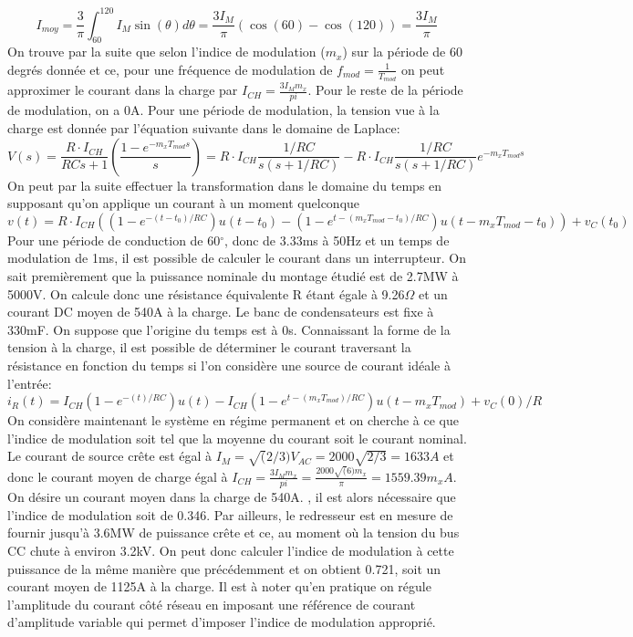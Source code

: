 \begin{equation}
I_{moy} = \frac{3}{\pi}\int_{60}^{120} I_M \sin(\theta)d\theta = \frac{3I_M}{\pi}\left( \cos(60)-\cos(120)\right) = \frac{3I_M}{\pi}
\end{equation}
On trouve par la suite que selon l'indice de modulation ($m_x$) sur la période de 60 degrés donnée et ce, pour une fréquence de modulation de $f_{mod} = \frac{1}{T_{mod}}$ on peut approximer le courant dans la charge par $I_{CH} = \frac{3I_M m_x}{pi}$. Pour le reste de la période de modulation, on a 0A. Pour une période de modulation, la tension vue à la charge est donnée par l'équation suivante dans le domaine de Laplace:
\begin{equation}
V(s) = \frac{R\cdot I_{CH}}{RCs + 1} \left(\frac{1 - e^{-m_xT_{mod}s}}{s}\right) = R\cdot I_{CH}\frac{1/RC}{s(s + 1/RC)} - R\cdot I_{CH}\frac{1/RC}{s(s + 1/RC)}e^{-m_xT_{mod}s}
\end{equation}
On peut par la suite effectuer la transformation dans le domaine du temps en supposant qu'on applique un courant à un moment quelconque
\begin{equation}
v(t) = R\cdot I_{CH}\left((1-e^{-(t-t_0)/RC})u(t-t_0) - (1-e^{t-(m_xT_{mod}-t_0)/RC})u(t-m_xT_{mod}-t_0)\right) + v_C(t_0)
\end{equation}
Pour une période de conduction de 60$^\circ$, donc de 3.33ms à 50Hz et un temps de modulation de 1ms, il est possible de calculer le courant dans un interrupteur. On sait premièrement que la puissance nominale du montage étudié est de 2.7MW à 5000V. On calcule donc une résistance équivalente R étant égale à 9.26$\Omega$ et un courant DC moyen de 540A à la charge. Le banc de condensateurs est fixe à 330mF. On suppose que l'origine du temps est à 0s. Connaissant la forme de la tension à la charge, il est possible de déterminer le courant traversant la résistance en fonction du temps si l'on considère une source de courant idéale à l'entrée:
\begin{equation}
i_R(t) = I_{CH}(1-e^{-(t)/RC})u(t) - I_{CH}(1-e^{t-(m_xT_{mod})/RC})u(t-m_xT_{mod}) + v_C(0)/R
\end{equation}
On considère maintenant le système en régime permanent et on cherche  à ce que l'indice de modulation soit tel que la moyenne du courant soit le courant nominal. Le courant de source crête est égal à $I_M = \sqrt(2/3)V_{AC} = 2000\sqrt{2/3} = 1633A$ et donc le courant moyen de charge égal à $I_{CH} = \frac{3I_M m_x}{pi} = \frac{2000\sqrt(6)m_x}{\pi} = 1559.39m_xA$. On désire un courant moyen dans la charge de 540A. , il est alors nécessaire que l'indice de modulation soit de 0.346. 
Par ailleurs, le redresseur est en mesure de fournir jusqu'à 3.6MW de puissance crête et ce, au moment où la tension du bus CC chute à environ 3.2kV. On peut donc calculer l'indice de modulation à cette puissance de la même manière que précédemment et on obtient 0.721, soit un courant moyen de 1125A à la charge. Il est à noter qu'en pratique on régule l'amplitude du courant côté réseau en imposant une référence de courant d'amplitude variable qui permet d'imposer l'indice de modulation approprié.

